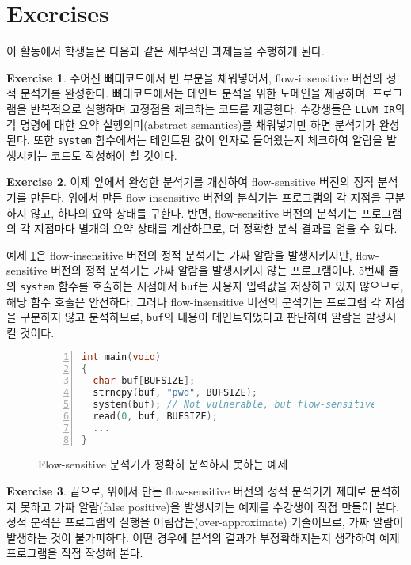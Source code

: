 \documentclass[a4paper, 11pt]{article}
\theoremstyle{definition}
\newtheorem{exercise}{Exercise}
\begin{document}
\section{Exercises}

이 활동에서 학생들은 다음과 같은 세부적인 과제들을 수행하게 된다.

\begin{exercise}
 주어진 뼈대코드에서 빈 부분을 채워넣어서, flow-insensitive 버전의 정적 분석기를
완성한다. 뼈대코드에서는 테인트 분석을 위한 도메인을 제공하며, 프로그램을
반복적으로 실행하며 고정점을 체크하는 코드를 제공한다. 수강생들은 \texttt{LLVM
IR}의 각 명령에 대한 요약 실행의미(abstract semantics)를 채워넣기만 하면
분석기가 완성된다. 또한 \texttt{system} 함수에서는 테인트된 값이 인자로
들어왔는지 체크하여 알람을 발생시키는 코드도 작성해야 할 것이다.
\end{exercise}

\begin{exercise}
 이제 앞에서 완성한 분석기를 개선하여 flow-sensitive 버전의 정적 분석기를
만든다. 위에서 만든 flow-insensitive 버전의 분석기는 프로그램의 각 지점을
구분하지 않고, 하나의 요약 상태를 구한다. 반면, flow-sensitive 버전의 분석기는
프로그램의 각 지점마다 별개의 요약 상태를 계산하므로, 더 정확한 분석 결과를
얻을 수 있다.

 예제 \ref{fig:example}은 flow-insensitive 버전의 정적 분석기는 가짜 알람을
발생시키지만, flow-sensitive 버전의 정적 분석기는 가짜 알람을 발생시키지 않는
프로그램이다. 5번째 줄의 \texttt{system} 함수를 호출하는 시점에서
\texttt{buf}는 사용자 입력값을 저장하고 있지 않으므로, 해당 함수 호출은
안전하다. 그러나 flow-insensitive 버전의 분석기는 프로그램 각 지점을 구분하지
않고 분석하므로, \texttt{buf}의 내용이 테인트되었다고 판단하여 알람을 발생시킬
것이다.

\begin{figure}
\begin{lstlisting}[language=C, frame=single, basicstyle=\footnotesize,
numbers=left, numbersep=1em, xleftmargin=2em, showstringspaces=false]
int main(void)
{
  char buf[BUFSIZE];
  strncpy(buf, "pwd", BUFSIZE);
  system(buf); // Not vulnerable, but flow-sensitive analyzer will raise alarm
  read(0, buf, BUFSIZE);
  ...
}
\end{lstlisting}
 \caption{Flow-sensitive 분석기가 정확히 분석하지 못하는 예제}
  \label{fig:example}
\end{figure}
\end{exercise}

\begin{exercise}
 끝으로, 위에서 만든 flow-sensitive 버전의 정적 분석기가 제대로 분석하지 못하고
가짜 알람(false positive)을 발생시키는 예제를 수강생이 직접 만들어 본다. 정적
분석은 프로그램의 실행을 어림잡는(over-approximate) 기술이므로, 가짜 알람이
발생하는 것이 불가피하다. 어떤 경우에 분석의 결과가 부정확해지는지 생각하여 예제
프로그램을 직접 작성해 본다.

\end{exercise}
\end{document}
